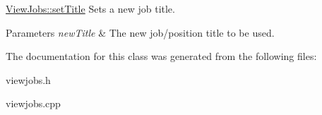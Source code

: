 \hyperlink{class_view_jobs_abfe1969197cde57ea049c1b7d91cd4f5}{View\+Jobs\+::set\+Title} Sets a new job title. 


\begin{DoxyParams}{Parameters}
{\em new\+Title} & The new job/position title to be used. \\
\hline
\end{DoxyParams}


The documentation for this class was generated from the following files\+:\begin{DoxyCompactItemize}
\item 
viewjobs.\+h\item 
viewjobs.\+cpp\end{DoxyCompactItemize}
